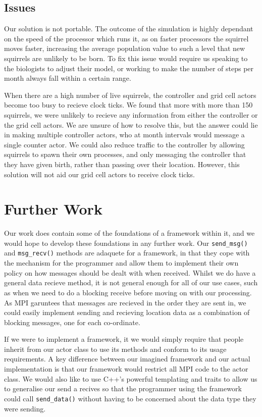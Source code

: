 \documentclass[oneside]{article}
\begin{document}
\subsection{Issues}
Our solution is not portable. The outcome of the simulation is highly dependant on the speed of the processor which runs it, as on faster processors the squirrel moves faster, increasing the average population value to such a level that new squirrels are unlikely to be born. To fix this issue would require us speaking to the biologists to adjust their model, or working to make the number of steps per month always fall within a certain range.

When there are a high number of live squirrels, the controller and grid cell actors become too busy to recieve clock ticks. We found that more with more than 150 squirrels, we were unlikely to recieve any information from either the controller or the grid cell actors. We are unsure of how to resolve this, but the answer could lie in making multiple controller actors, who at month intervals would message a single counter actor. We could also reduce traffic to the controller by allowing squirrels to spawn their own processes, and only messaging the controller that they have given birth, rather than passing over their location. However, this solution will not aid our grid cell actors to receive clock ticks.

\section{Further Work}\label{sec:fur}
Our work does contain some of the foundations of a framework within it, and we would hope to develop these foundations in any further work. Our \texttt{send\_msg()} and \texttt{msg\_recv()} methods are adaquete for a framework, in that they cope with the mechanism for the programmer and allow them to implement their own policy on how messages should be dealt with when received.  Whilst we do have a general data recieve method, it is not general enough for all of our use cases, such as when we need to do a blocking receive before moving on with our processing. As MPI garuntees that messages are recieved in the order they are sent in, we could easily implement sending and recieving location data as a combination of blocking messages, one for each co-ordinate.

If we were to implement a framework, it we would simply require that people inherit from our actor class to use its methods and conform to its usage requirements. A key difference between our imagined framework and our actual implementation is that our framework would restrict all MPI code to the actor class. We would also like to use C++'s powerful templating and traits to allow us to generalise our send a recives so that the programmer using the framework could call \texttt{send\_data()} without having to be concerned about the data type they were sending.


\end{document}
